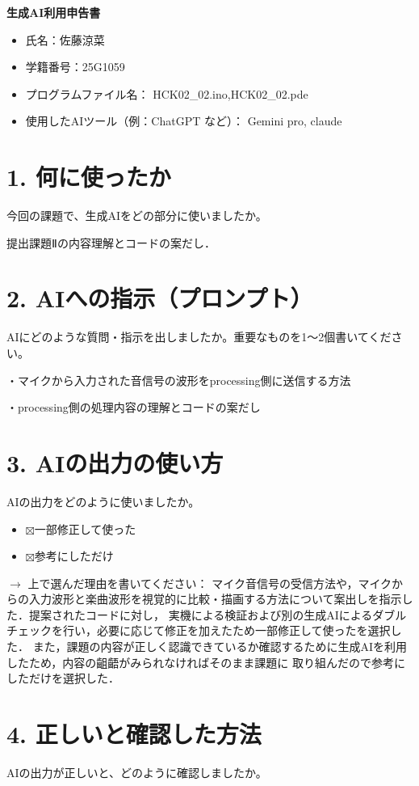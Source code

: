 \documentclass[a4paper,11pt,dvipdfmx]{jsarticle}
\newcommand{\cboxon}{$\boxtimes$}
\begin{document}
{\LARGE\bfseries 生成AI利用申告書}
\vspace{1em}

\begin{itemize}
  \item 氏名：佐藤涼菜
  \item 学籍番号：25G1059
  \item プログラムファイル名： HCK02\_02.ino,HCK02\_02.pde
  \item 使用したAIツール（例：ChatGPT など）： Gemini pro, claude
\end{itemize}

\section*{1. 何に使ったか}
今回の課題で、生成AIをどの部分に使いましたか。


提出課題Ⅱの内容理解とコードの案だし．

\section*{2. AIへの指示（プロンプト）}
AIにどのような質問・指示を出しましたか。重要なものを1〜2個書いてください。

・マイクから入力された音信号の波形をprocessing側に送信する方法\par
・processing側の処理内容の理解とコードの案だし\par

\section*{3. AIの出力の使い方}
AIの出力をどのように使いましたか。
\begin{itemize}
  \item \cboxon 一部修正して使った
  \item \cboxon 参考にしただけ
\end{itemize}
$\rightarrow$ 上で選んだ理由を書いてください：
マイク音信号の受信方法や，マイクからの入力波形と楽曲波形を視覚的に比較・描画する方法について案出しを指示した．提案されたコードに対し，
実機による検証および別の生成AIによるダブルチェックを行い，必要に応じて修正を加えたため一部修正して使ったを選択した．
また，課題の内容が正しく認識できているか確認するために生成AIを利用したため，内容の齟齬がみられなければそのまま課題に
取り組んだので参考にしただけを選択した．

\section*{4. 正しいと確認した方法}
AIの出力が正しいと、どのように確認しましたか。
\end{document}
